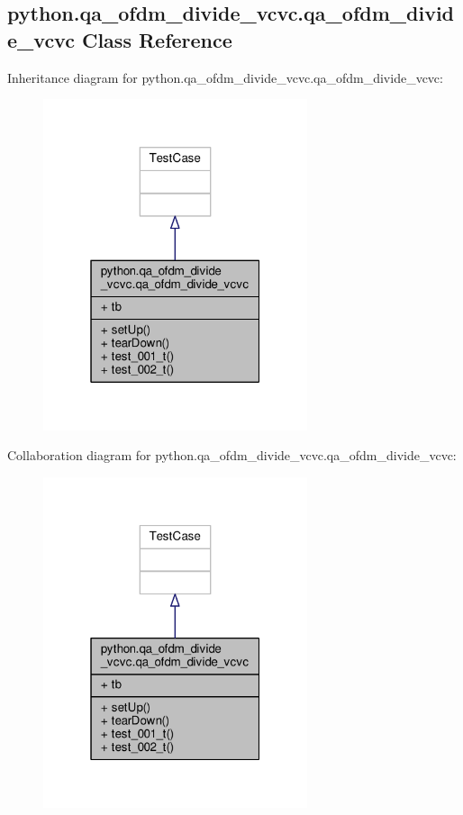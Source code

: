 \subsection{python.\+qa\+\_\+ofdm\+\_\+divide\+\_\+vcvc.\+qa\+\_\+ofdm\+\_\+divide\+\_\+vcvc Class Reference}
\label{classpython_1_1qa__ofdm__divide__vcvc_1_1qa__ofdm__divide__vcvc}


Inheritance diagram for python.\+qa\+\_\+ofdm\+\_\+divide\+\_\+vcvc.\+qa\+\_\+ofdm\+\_\+divide\+\_\+vcvc\+:
\nopagebreak
\begin{figure}[H]
\begin{center}
\leavevmode
\includegraphics[width=220pt]{de/d9c/classpython_1_1qa__ofdm__divide__vcvc_1_1qa__ofdm__divide__vcvc__inherit__graph}
\end{center}
\end{figure}


Collaboration diagram for python.\+qa\+\_\+ofdm\+\_\+divide\+\_\+vcvc.\+qa\+\_\+ofdm\+\_\+divide\+\_\+vcvc\+:
\nopagebreak
\begin{figure}[H]
\begin{center}
\leavevmode
\includegraphics[width=220pt]{d4/d81/classpython_1_1qa__ofdm__divide__vcvc_1_1qa__ofdm__divide__vcvc__coll__graph}
\end{center}
\end{figure}
